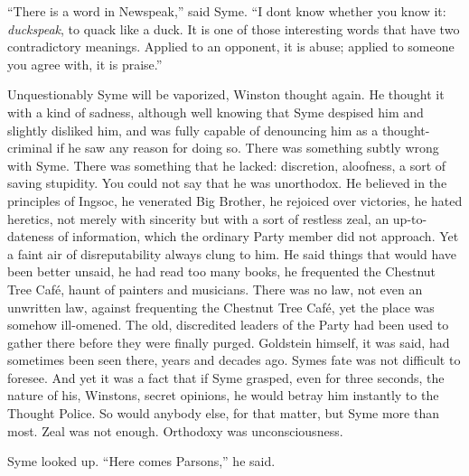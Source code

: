 ``There is a word in Newspeak,'' said Syme. ``I don\textquotesingle t know
whether you know it: \emph{duckspeak}, to quack like a duck. It is one
of those interesting words that have two contradictory meanings. Applied
to an opponent, it is abuse; applied to someone you agree with, it is
praise.''

Unquestionably Syme will be vaporized, Winston thought again. He thought
it with a kind of sadness, although well knowing that Syme despised him
and slightly disliked him, and was fully capable of denouncing him as a
thought-criminal if he saw any reason for doing so. There was something
subtly wrong with Syme. There was something that he lacked: discretion,
aloofness, a sort of saving stupidity. You could not say that he was
unorthodox. He believed in the principles of Ingsoc, he venerated Big
Brother, he rejoiced over victories, he hated heretics, not merely with
sincerity but with a sort of restless zeal, an up-to-dateness of
information, which the ordinary Party member did not approach. Yet a
faint air of disreputability always clung to him. He said things that
would have been better unsaid, he had read too many books, he frequented
the Chestnut Tree Café, haunt of painters and musicians. There was no
law, not even an unwritten law, against frequenting the Chestnut Tree
Café, yet the place was somehow ill-omened. The old, discredited leaders
of the Party had been used to gather there before they were finally
purged. Goldstein himself, it was said, had sometimes been seen there,
years and decades ago. Syme\textquotesingle s fate was not difficult to
foresee. And yet it was a fact that if Syme grasped, even for three
seconds, the nature of his, Winston\textquotesingle s, secret opinions,
he would betray him instantly to the Thought Police. So would anybody
else, for that matter, but Syme more than most. Zeal was not enough.
Orthodoxy was unconsciousness.

Syme looked up. ``Here comes Parsons,'' he said.

